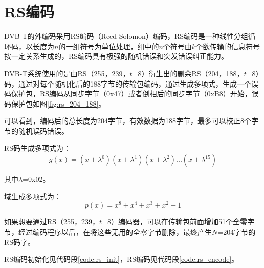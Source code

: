 	\section{RS编码}
		\par DVB-T的外编码采用RS编码（Reed-Solomon）编码，RS编码是一种线性分组循环码，以长度为$n$的一组符号为单位处理，组中的$n$个符号由$k$个欲传输的信息符号按一定关系生成的，RS编码具有极强的随机错误和突发错误纠正能力。
		\par DVB-T系统使用的是由RS（255，239，$t$=8）衍生出的删余RS（204，188，$t$=8）码，通过对每个随机化后的188字节的传输包编码，通过生成多项式，生成一个误码保护包，RS编码从同步字节（0x47）或者倒相后的同步字节（0xB8）开始，误码保护包如图\ref{fig:rs_204_188}。\cite{RS编码器的设计与实现_游余新}
		
		\par 可以看到，编码后的总长度为204字节，有效数据为188字节，最多可以校正8个字节的随机误码错误。
		\par RS码生成多项式为：
		\begin{equation}
			g(x)=(x+\lambda ^0)(x+\lambda ^1)(x+\lambda ^2)...(x+\lambda ^{15})
		\end{equation}
		\par 其中$\lambda$=0x02。
		\par 域生成多项式为：
		\begin{equation}
			p(x)=x^8+x^4+x^3+x^2+1
		\end{equation}
		\par 如果想要通过RS（255，239，$t$=8）编码器，可以在传输包前面增加51个全零字节，经过编码程序以后，在将这些无用的全零字节删除，最终产生$N$=204字节的RS码字。
		\par RS编码初始化见代码段\ref{code:rs_init}，RS编码见代码段\ref{code:rs_encode}。
